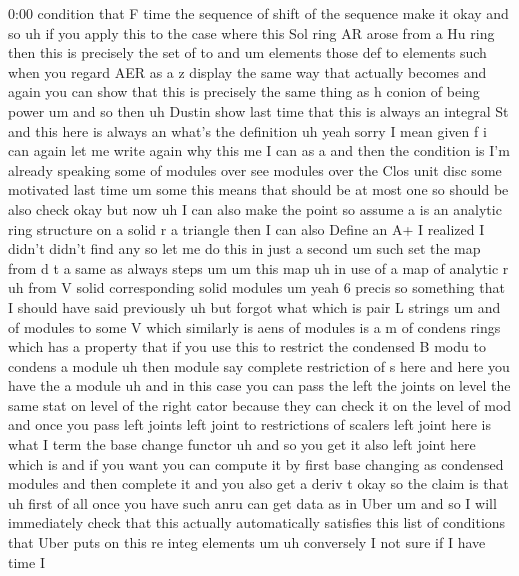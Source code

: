 \begin{unfinished}{0:00}
condition  that  F  time  the  sequence  of
shift  of  the  sequence  make
it
okay  and  so
uh  if  you  apply  this  to  the  case  where
this  Sol  ring  AR  arose  from  a  Hu  ring
then  this  is  precisely  the  set  of
to
and
um  elements  those  def  to
elements
such  when  you  regard  AER  as  a  z
display  the  same  way  that  actually
becomes  and  again  you  can  show  that  this
is  precisely  the  same  thing  as  h
conion  of  being  power  um  and  so
then  uh  Dustin  show  last  time  that  this
is  always  an  integral
St
and  this  here  is  always
an  what's  the
definition  uh  yeah  sorry  I  mean  given  f
i  can
again
let  me  write
again  why  this  me  I  can  as  a  and  then
the  condition
is  I'm  already  speaking  some  of  modules
over  see  modules  over  the  Clos  unit  disc
some  motivated  last  time  um  some  this
means  that
should  be  at  most  one  so  should
be  also
check  okay  but  now
uh  I  can  also  make  the  point  so
assume  a  is  an  analytic  ring  structure
on  a  solid
r  a  triangle  then  I  can  also  Define  an
A+  I  realized  I  didn't  didn't  find  any
so  let  me  do  this  in  just  a  second
um  such  set  the  map  from  d  t  a  same  as
always  steps
um
um  this  map  uh  in  use  of  a  map  of
analytic
r
uh  from  V
solid  corresponding  solid  modules
um  yeah  6
precis  so  something  that  I  should  have
said  previously  uh  but
forgot
what  which  is
pair  L
strings  um  and  of  modules  to  some  V
which  similarly  is
aens  of
modules  is  a
m
of  condens
rings  which  has  a  property  that  if  you
use  this  to  restrict  the  condensed  B
modu  to  condens  a  module  uh
then  module  say
complete  restriction  of  s
here  and  here  you  have  the  a
module
uh
and  in  this  case  you  can  pass  the  left
the
joints  on  level  the  same  stat  on  level
of  the  right  cator  because  they  can
check  it  on  the  level  of
mod
and  once  you  pass  left  joints  left  joint
to  restrictions  of  scalers  left  joint
here  is  what  I  term  the  base  change
functor  uh  and  so  you  get  it  also  left
joint
here  which
is
and  if  you  want  you  can  compute  it  by
first  base  changing  as  condensed  modules
and  then  complete
it  and  you  also  get  a  deriv
t
okay  so  the  claim  is  that  uh  first  of
all  once  you  have  such  anru  can  get  data
as  in  Uber  um  and  so  I  will  immediately
check  that  this  actually  automatically
satisfies  this  list  of  conditions  that
Uber  puts  on  this  re  integ  elements
um
uh
conversely  I  not  sure  if  I  have  time  I

\end{unfinished}
